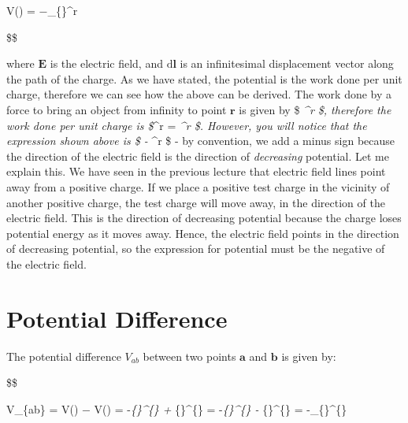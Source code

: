\documentclass[
  letterpaper,
  DIV=11,
  numbers=noendperiod]{scrreprt}
\begin{document}
V() = −\int\_\{\infty\}\^{}r
 \cdot {} 

\$\$

where \(\mathrm{\mathbf{E}}\) is the electric field, and
\(\mathrm{d}\mathrm{\mathbf{l}}\) is an infinitesimal displacement
vector along the path of the charge. As we have stated, the potential is
the work done per unit charge, therefore we can see how the above can be
derived. The work done by a force to bring an object from infinity to
point \(\mathrm{\mathbf{r}}\) is given by \$ \int\emph{\infty\^{}r
 \cdot {}\$, therefore the
work done per unit charge is \$\int}\infty\^{}r
 \cdot {} =
\int\emph{\infty\^{}r
 \cdot {} \$. However, you
will notice that the expression shown above is \$ - \int}\infty\^{}r
 \cdot {} \$ - by
convention, we add a minus sign because the direction of the electric
field is the direction of \emph{decreasing} potential. Let me explain
this. We have seen in the previous lecture that electric field lines
point away from a positive charge. If we place a positive test charge in
the vicinity of another positive charge, the test charge will move away,
in the direction of the electric field. This is the direction of
decreasing potential because the charge loses potential energy as it
moves away. Hence, the electric field points in the direction of
decreasing potential, so the expression for potential must be the
negative of the electric field.

\section{Potential Difference}\label{potential-difference}

The potential difference \(V_{ab}\) between two points
\(\mathrm{\mathbf{a}}\) and \(\mathrm{\mathbf{b}}\) is given by:

\$\$

V\_\{ab\} = V() − V() =
-\int\emph{\{\infty\}\^{}\{\}
 \cdot {}  +
\int}\{\infty\}\^{}\{\}
 \cdot {}  =
-\int\emph{\{\infty\}\^{}\{\}
 \cdot {}  -
\int}\{\}\^{}\{\infty\}
 \cdot {}  =
-\int\_\{\}\^{}\{\}
 \cdot {} 
\end{document}
